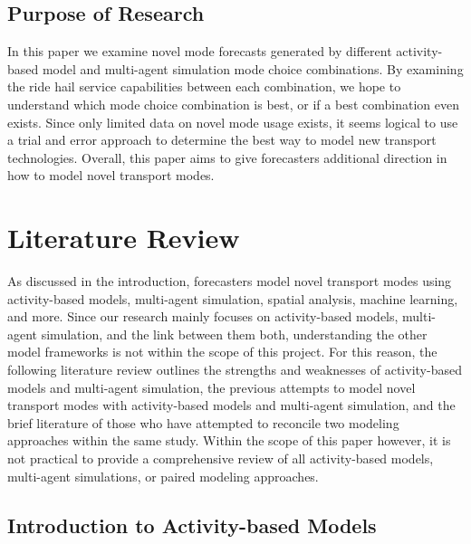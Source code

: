 \documentclass[12pt, oneside, openright]{byuthesis}
\begin{document}
\hypertarget{purpose-of-research}{%
\section{Purpose of Research}\label{purpose-of-research}}

In this paper we examine novel mode forecasts generated by different activity-based model and multi-agent simulation mode choice combinations. By examining the ride hail service capabilities between each combination, we hope to understand which mode choice combination is best, or if a best combination even exists. Since only limited data on novel mode usage exists, it seems logical to use a trial and error approach to determine the best way to model new transport technologies. Overall, this paper aims to give forecasters additional direction in how to model novel transport modes.

\hypertarget{literature-review}{%
\chapter{Literature Review}\label{literature-review}}

As discussed in the introduction, forecasters model novel transport modes using activity-based models, multi-agent simulation, spatial analysis, machine learning, and more. Since our research mainly focuses on activity-based models, multi-agent simulation, and the link between them both, understanding the other model frameworks is not within the scope of this project. For this reason, the following literature review outlines the strengths and weaknesses of activity-based models and multi-agent simulation, the previous attempts to model novel transport modes with activity-based models and multi-agent simulation, and the brief literature of those who have attempted to reconcile two modeling approaches within the same study. Within the scope of this paper however, it is not practical to provide a comprehensive review of all activity-based models, multi-agent simulations, or paired modeling approaches.

\hypertarget{lit-abm}{%
\section{Introduction to Activity-based Models}\label{lit-abm}}
\end{document}
